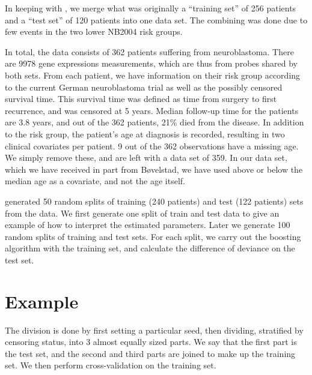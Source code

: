In keeping with \citet{bovelstad2009}, we merge what was originally a ``training set'' of 256 patients and a ``test set'' of 120 patients into one data set.
The combining was done due to few events in the two lower NB2004 risk groups.

In total, the data consists of 362 patients suffering from neuroblastoma.
There are 9978 gene expressions measurements, which are thus from probes shared by both sets.
From each patient, we have information on their risk group according to the current German neuroblastoma trial as well as the possibly censored survival time.
This survival time was defined as time from surgery to first recurrence, and was censored at 5 years.
Median follow-up time for the patients are 3.8 years, and out of the 362 patients, 21\% died from the disease.
In addition to the risk group, the patient's age at diagnosis is recorded, resulting in two clinical covariates per patient.
9 out of the 362 observations have a missing age.
We simply remove these, and are left with a data set of 359.
In our data set, which we have received in part from Bøvelstad, we have used above or below the median age as a covariate, and not the age itself.

\citet{bovelstad2009} generated 50 random splits of training (240 patients) and test (122 patients) sets from the data.
We first generate one split of train and test data to give an example of how to interpret the estimated parameters.
Later we generate 100 random splits of training and test sets.
For each split, we carry out the boosting algorithm with the training set, and calculate the difference of deviance on the test set.

\section{Example}
The division is done by first setting a particular seed, then dividing, stratified by censoring status, into 3 almost equally sized parts.
We say that the first part is the test set, and the second and third parts are joined to make up the training set.
We then perform cross-validation on the training set.


